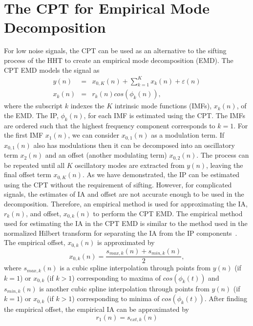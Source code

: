 \documentclass[journal,11pt,a4paper,onecolumn,draftcls]{IEEEtran}
\begin{document}
\section{The CPT for Empirical Mode Decomposition}\label{sect:CPTEMDSection}
For low noise signals, the CPT can be used as an alternative to the sifting process of the HHT to create an empirical mode decomposition (EMD). The CPT EMD models the signal as
\begin{eqnarray}
    y(n) &=& x_{0,K}(n) + \sum_{k=1}^{K}x_k(n) + \varepsilon(n) \\
    x_k\left(n\right) &=& r_k\left(n\right)cos\left(\phi_k\left(n\right)\right),
\end{eqnarray}
where the subscript $k$ indexes the $K$ intrinsic mode functions (IMFs), $x_k(n)$, of the EMD. The IP, $\phi_k(n)$, for each IMF is estimated using the CPT. The IMFs are ordered such that the highest frequency component corresponds to $k=1$. For the first IMF $x_1(n)$, we can consider $x_{0,1}(n)$ as a modulation term. If $x_{0,1}(n)$ also has modulations then it can be decomposed into an oscillatory term $x_2(n)$ and an offset (another modulating term) $x_{0,2}(n)$. The process can be repeated until all $K$ oscillatory modes are extracted from $y(n)$, leaving the final offset term $x_{0,K}(n)$.
 As we have demonstrated, the IP can be estimated using the CPT without the requirement of sifting. However, for complicated signals, the estimates of IA and offset are not accurate enough to be used in the decomposition. Therefore, an empirical method is used for approximating the IA, $r_k(n)$, and offset, $x_{0,k}(n)$ to perform the CPT EMD. The empirical method used for estimating the IA in the CPT EMD is similar to the method used in the normalized Hilbert transform for separating the IA from the IP components~\cite{Huang2005}. The empirical offset, $x_{0,k}(n)$ is approximated by
\begin{equation}
    x_{0,k}(n) = \frac{s_{max,k}(n) + s_{min,k}(n)}{2},
\end{equation}
where $s_{max,k}(n)$ is a cubic spline interpolation through points from $y(n)$ (if $k=1$) or $x_{0,k}$ (if $k>1$) corresponding to maxima of $cos(\phi_k(t))$ and $s_{min,k}(n)$ is another cubic spline interpolation through points from $y(n)$ (if $k=1$) or $x_{0,k}$ (if $k>1$) corresponding to minima of $cos(\phi_k(t))$. After finding the empirical offset, the empirical IA can be approximated by 
\begin{equation}
    r_1(n) = s_{ext,k}(n)
\end{equation}
\end{document}
